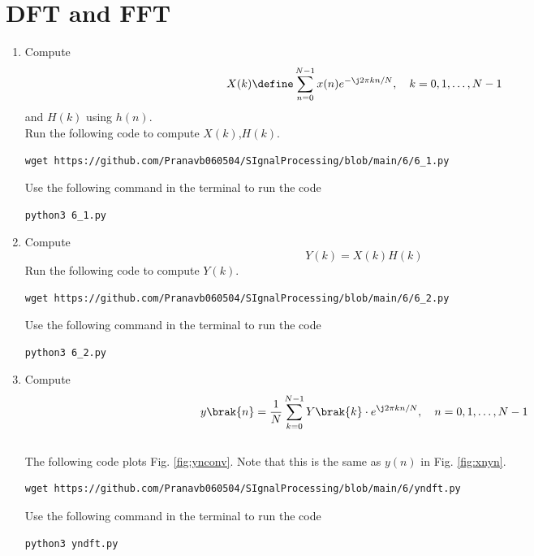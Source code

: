 \documentclass[journal,12pt,twocolumn]{IEEEtran}
\renewcommand\thesection{\arabic{section}}
\begin{document}
\section{DFT and FFT}
\begin{enumerate}[label=\thesection.\arabic*]
\item
Compute
\begin{equation}
X(k) \define \sum _{n=0}^{N-1}x(n) e^{-\j2\pi kn/N}, \quad k = 0,1,\dots, N-1
\end{equation}
\label{eq:eq6.2}
and $H(k)$ using $h(n)$.\\
\solution Run the following code to compute $X(k)$,$H(k)$.
\begin{lstlisting}
wget https://github.com/Pranavb060504/SIgnalProcessing/blob/main/6/6_1.py
\end{lstlisting}
Use the following command in the terminal to run the code
\begin{lstlisting}
python3 6_1.py
\end{lstlisting}
\item Compute 
\begin{equation}
Y(k) = X(k)H(k)
\end{equation}
\solution Run the following code to compute $Y(k)$.
\begin{lstlisting}
wget https://github.com/Pranavb060504/SIgnalProcessing/blob/main/6/6_2.py
\end{lstlisting}
Use the following command in the terminal to run the code
\begin{lstlisting}
python3 6_2.py
\end{lstlisting}
\item Compute
\begin{equation}
 y\brak{n}={\frac {1}{N}}\sum _{k=0}^{N-1}Y\brak{k}\cdot e^{\j 2\pi kn/N},\quad n = 0,1,\dots, N-1
\end{equation}
\\
\solution The following code plots Fig. \ref{fig:ynconv}. Note that this is the same as 
$y(n)$ in  Fig. 
\ref{fig:xnyn}. 
%
\begin{lstlisting}
wget https://github.com/Pranavb060504/SIgnalProcessing/blob/main/6/yndft.py
\end{lstlisting}
Use the following command in the terminal to run the code
\begin{lstlisting}
python3 yndft.py
\end{lstlisting}

\end{enumerate}
\end{document}
